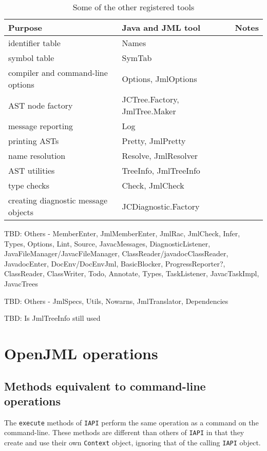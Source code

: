 \documentclass{report}%
\begin{document}
\begin{table}[bth]
\begin{center}
\begin{tabular}{|l|l|l|}

\hline
Purpose & Java and JML tool &  Notes \\
\hline
identifier table & Names & \\
\hline
symbol table & SymTab & \\
\hline
compiler and command-line options & Options, JmlOptions & \\
\hline
AST node factory & JCTree.Factory, JmlTree.Maker & \\
\hline
message reporting & Log & \\
\hline
printing ASTs & Pretty, JmlPretty & \\
\hline
name resolution & Resolve, JmlResolver & \\
\hline
AST utilities & TreeInfo, JmlTreeInfo & \\
\hline
type checks & Check, JmlCheck & \\
\hline
creating diagnostic message objects & JCDiagnostic.Factory & \\
\hline
\end{tabular}
\end{center}
\caption{Some of the other registered tools}
\label{Tools2}
\end{table}

TBD: Others - MemberEnter, JmlMemberEnter, JmlRac, JmlCheck, Infer, Types, Options, Lint, Source, JavacMessages, DiagnosticListener, JavaFileManager/JavacFileManager, ClassReader/javadocClassReader, JavadocEnter, DocEnv/DocEnvJml, BasicBlocker, ProgressReporter?, ClassReader, ClassWriter, Todo, Annotate, Types, TaskListener, JavacTaskImpl, JavacTrees

TBD: Others - JmlSpecs, Utils, Nowarns, JmlTranslator, Dependencies

TBD: Is JmlTreeInfo still used

\section{OpenJML operations}

\subsection{Methods equivalent to command-line operations}

The {\tt execute} methods of {\tt IAPI} perform the same operation as a command on the command-line.
These methods are different than others of {\tt IAPI} in that they create and use their own {\tt Context}
object, ignoring that of the calling {\tt IAPI} object.
\end{document}
